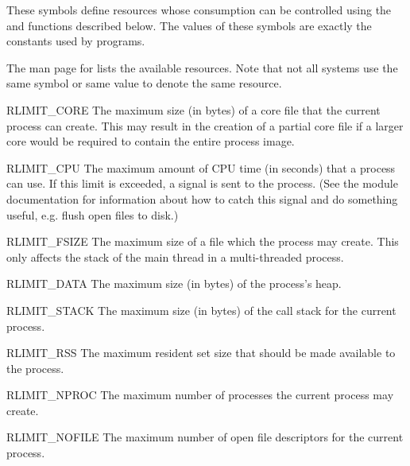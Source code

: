 These symbols define resources whose consumption can be controlled
using the  and  functions
described below. The values of these symbols are exactly the constants
used by \C{} programs.

The \UNIX{} man page for  lists the available
resources.  Note that not all systems use the same symbol or same
value to denote the same resource.

\begin{datadesc}{RLIMIT_CORE}
  The maximum size (in bytes) of a core file that the current process
  can create.  This may result in the creation of a partial core file
  if a larger core would be required to contain the entire process
  image.
\end{datadesc}

\begin{datadesc}{RLIMIT_CPU}
  The maximum amount of CPU time (in seconds) that a process can
  use. If this limit is exceeded, a  signal is sent to
  the process. (See the  module documentation for
  information about how to catch this signal and do something useful,
  e.g. flush open files to disk.)
\end{datadesc}

\begin{datadesc}{RLIMIT_FSIZE}
  The maximum size of a file which the process may create.  This only
  affects the stack of the main thread in a multi-threaded process.
\end{datadesc}

\begin{datadesc}{RLIMIT_DATA}
  The maximum size (in bytes) of the process's heap.
\end{datadesc}

\begin{datadesc}{RLIMIT_STACK}
  The maximum size (in bytes) of the call stack for the current
  process.
\end{datadesc}

\begin{datadesc}{RLIMIT_RSS}
  The maximum resident set size that should be made available to the
  process.
\end{datadesc}

\begin{datadesc}{RLIMIT_NPROC}
  The maximum number of processes the current process may create.
\end{datadesc}

\begin{datadesc}{RLIMIT_NOFILE}
  The maximum number of open file descriptors for the current
  process.
\end{datadesc}

